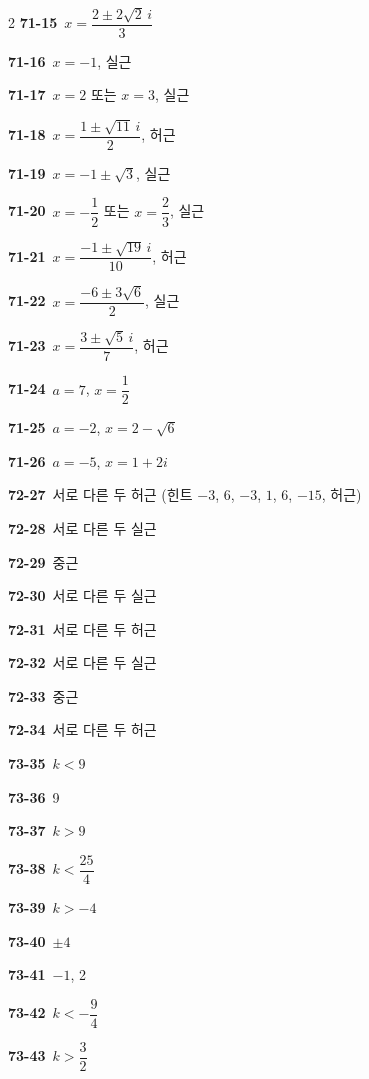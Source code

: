 \documentclass[10pt,a4paper]{article}
\begin{document}
\begin{multicols}{2}
\noindent\textbf{71-15}\ $x=\dfrac{2\pm2\sqrt{2}\,i}{3}$\par
\noindent\textbf{71-16}\ $x=-1$, 실근\par
\noindent\textbf{71-17}\ $x=2$ 또는 $x=3$, 실근\par
\noindent\textbf{71-18}\ $x=\dfrac{1\pm\sqrt{11}\,i}{2}$, 허근\par
\noindent\textbf{71-19}\ $x=-1\pm\sqrt{3}$, 실근\par
\noindent\textbf{71-20}\ $x=-\dfrac{1}{2}$ 또는 $x=\dfrac{2}{3}$, 실근\par
\noindent\textbf{71-21}\ $x=\dfrac{-1\pm\sqrt{19}\,i}{10}$, 허근\par
\noindent\textbf{71-22}\ $x=\dfrac{-6\pm3\sqrt{6}}{2}$, 실근\par
\noindent\textbf{71-23}\ $x=\dfrac{3\pm\sqrt{5}\,i}{7}$, 허근\par
\noindent\textbf{71-24}\ $a=7$, $x=\dfrac{1}{2}$\par
\noindent\textbf{71-25}\ $a=-2$, $x=2-\sqrt{6}$\par
\noindent\textbf{71-26}\ $a=-5$, $x=1+2i$\par
\noindent\textbf{72-27}\ 서로 다른 두 허근 (힌트 $-3$, $6$, $-3$, $1$, $6$, $-15$, 허근)\par
\noindent\textbf{72-28}\ 서로 다른 두 실근\par
\noindent\textbf{72-29}\ 중근\par
\noindent\textbf{72-30}\ 서로 다른 두 실근\par
\noindent\textbf{72-31}\ 서로 다른 두 허근\par
\noindent\textbf{72-32}\ 서로 다른 두 실근\par
\noindent\textbf{72-33}\ 중근\par
\noindent\textbf{72-34}\ 서로 다른 두 허근\par
\noindent\textbf{73-35}\ $k<9$\par
\noindent\textbf{73-36}\ 9\par
\noindent\textbf{73-37}\ $k>9$\par
\noindent\textbf{73-38}\ $k<\dfrac{25}{4}$\par
\noindent\textbf{73-39}\ $k>-4$\par
\noindent\textbf{73-40}\ $\pm4$\par
\noindent\textbf{73-41}\ $-1$, 2\par
\noindent\textbf{73-42}\ $k<-\dfrac{9}{4}$\par
\noindent\textbf{73-43}\ $k>\dfrac{3}{2}$\par

\end{multicols}
\end{document}
